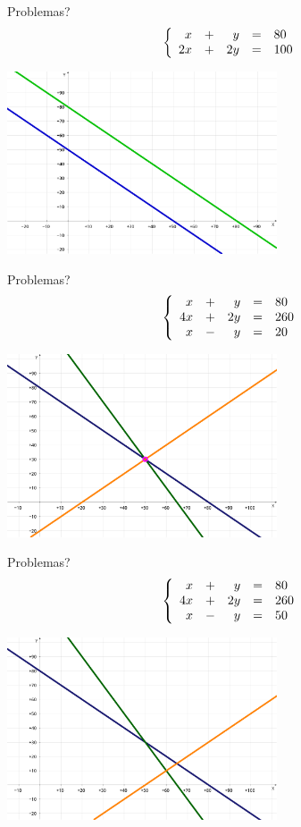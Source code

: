 \documentclass[hyperref={pdfpagelabels=false}]{beamer}
\begin{document}
\begin{frame}{Problemas?}
	$$\left\{ \begin{array}{r c r c l} x&+&y&=&80\\2x&+&2y&=&100 \end{array} \right.$$
	\begin{center}
	   \includegraphics[width=8cm]{img/inconsistente.png}
	\end{center}
\end{frame}

\begin{frame}{Problemas?}
	$$\left\{ \begin{array}{r c r c l} x&+&y&=&80\\4x&+&2y&=&260\\x&-&y&=&20 \end{array} \right.$$
	\begin{center}
	   \includegraphics[width=8cm]{img/treseqs.png}
	\end{center}
\end{frame}

\begin{frame}{Problemas?}
	$$\left\{ \begin{array}{r c r c l} x&+&y&=&80\\4x&+&2y&=&260\\x&-&y&=&50 \end{array} \right.$$
	\begin{center}
	  \includegraphics[width=8cm]{img/sobredeterminado.png}
	\end{center}
\end{frame}
\end{document}
